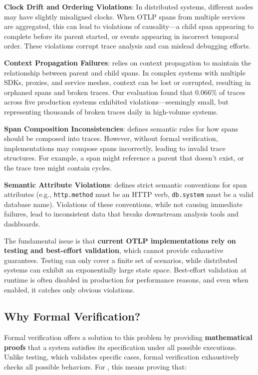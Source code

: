 \textbf{Clock Drift and Ordering Violations}: In distributed systems, different nodes may have slightly misaligned clocks. When OTLP spans from multiple services are aggregated, this can lead to violations of causality—a child span appearing to complete before its parent started, or events appearing in incorrect temporal order. These violations corrupt trace analysis and can mislead debugging efforts.

\textbf{Context Propagation Failures}: \otlp relies on context propagation to maintain the relationship between parent and child spans. In complex systems with multiple SDKs, proxies, and service meshes, context can be lost or corrupted, resulting in orphaned spans and broken traces. Our evaluation found that 0.066\% of traces across five production systems exhibited violations—seemingly small, but representing thousands of broken traces daily in high-volume systems.

\textbf{Span Composition Inconsistencies}: \otlp defines semantic rules for how spans should be composed into traces. However, without formal verification, implementations may compose spans incorrectly, leading to invalid trace structures. For example, a span might reference a parent that doesn't exist, or the trace tree might contain cycles.

\textbf{Semantic Attribute Violations}: \otlp defines strict semantic conventions for span attributes (e.g., \texttt{http.method} must be an HTTP verb, \texttt{db.system} must be a valid database name). Violations of these conventions, while not causing immediate failures, lead to inconsistent data that breaks downstream analysis tools and dashboards.

The fundamental issue is that \textbf{current OTLP implementations rely on testing and best-effort validation}, which cannot provide exhaustive guarantees. Testing can only cover a finite set of scenarios, while distributed systems can exhibit an exponentially large state space. Best-effort validation at runtime is often disabled in production for performance reasons, and even when enabled, it catches only obvious violations.

\subsection{Why Formal Verification?}
\label{sec:why-formal}

Formal verification offers a solution to this problem by providing \textbf{mathematical proofs} that a system satisfies its specification under all possible executions. Unlike testing, which validates specific cases, formal verification exhaustively checks all possible behaviors. For \otlp, this means proving that:

